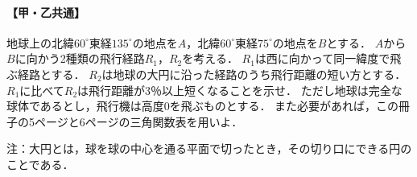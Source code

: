 \documentclass[../../main.tex]{subfiles}
\begin{document}
\paragraph{【甲・乙共通】}
地球上の北緯$60^\circ$東経$135^\circ$の地点を$A$，北緯$60^\circ$東経$75^\circ$の地点を$B$とする．
$A$から$B$に向かう2種類の飛行経路$R_1$，$R_2$を考える．
$R_1$は西に向かって同一緯度で飛ぶ経路とする．
$R_2$は地球の大円に沿った経路のうち飛行距離の短い方とする．
$R_1$に比べて$R_2$は飛行距離が3％以上短くなることを示せ．
ただし地球は完全な球体であるとし，飛行機は高度0を飛ぶものとする．
また必要があれば，この冊子の5ページと6ページの三角関数表を用いよ．

注：大円とは，球を球の中心を通る平面で切ったとき，その切り口にできる円のことである．
\end{document}
